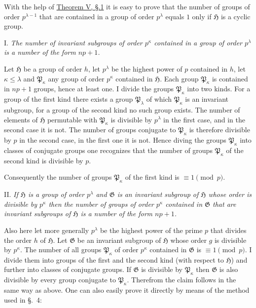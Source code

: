 \documentclass[a5paper,12pt]{article}
\let\fr\mathfrak
\newcommand{\CG}{\fr{G}}
\newcommand{\CH}{\fr{H}}
\newcommand{\CP}{\fr{P}}
\newcommand{\?}{{\color{blue}${}^{(?)}$}}
\newcounter{origpagecounter}{}
\newcommand{\origpagebreak}{\mark{\arabic{origpagecounter}}\addtocounter{origpagecounter}{1}\mark{\arabic{origpagecounter}}}
\begin{document}

With the help of 
\hyperref[t:1-5]{Theorem V, \S.1}
it is easy to prove
that the number of groups of order $p^{\lambda-1}$
that are contained in a group of order $p^\lambda$
equals $1$
only if
$\CH$ is a cyclic group.


I.
%
\label{t:5-1}
%
\emph{ %
The number of invariant subgroups of order $p^\kappa$
contained in a group of order $p^\lambda$
is a number of the form $n p + 1$.
}


Let $\CH$ be a group of order $h$,
let $p^\lambda$ be the highest power of $p$ contained in $h$,
let $\kappa \leq \lambda$
and
$\CP_\kappa$ any group of order $p^\kappa$
contained in $\CH$.
%
%
Each group $\CP_\kappa$ is contained in $n p + 1$ groups,
hence at least one.
%
%
I divide the groups $\CP_\kappa$
into two kinds.
%
%
For a group of the first kind
there exists 
a group $\CP_\lambda$
of which $\CP_\kappa$ is an invariant subgroup,
for a group of the second kind
no such group exists.
%
%
The number of elements of $\CH$
permutable with $\CP_\kappa$
is divisible by $p^\lambda$ in the first case,
and
in the second case it is not.
%
%
The number of groups
conjugate to $\CP_\kappa$ is therefore
divisible by $p$ in the second case,
in the first one it is not.
%
%
Hence diving the groups $\CP_\kappa$
into classes of conjugate groups
one recognizes
that the number of groups $\CP_\kappa$
of the second kind 
is divisible by $p$.
%
%
\origpagebreak
%
%
Consequently
the number of groups $\CP_\kappa$ of the first kind
is $\equiv 1 \pmod{p}$.


II.
%
\label{t:5-2}
%
\emph{ %
If $\CH$ is a group of order $p^\lambda$
and $\CG$ is an invariant subgroup of $\CH$
whose order is divisible by $p^\kappa$
then the number of groups of order $p^\kappa$
contained in $\CG$
that are invariant subgroups of $\CH$
is
a number of the form $n p + 1$.
}


Also here let more generally
$p^\lambda$ be the highest power of the prime $p$
that divides the order $h$ of $\CH$.
%
%
Let $\CG$ be an invariant subgroup of $\CH$
whose order $g$ is divisible by $p^\kappa$.
%
%
The number of all groups $\CP_\kappa$ of order $p^\kappa$
contained in $\CG$
is $\equiv 1 \pmod{p}$.
%
%
I divide them into groups of the first and the second kind
(with respect to $\CH$)
and
further
into classes of conjugate groups.
%
%
If $\CG$ is divisible by $\CP_\kappa$
then
$\CG$ is also divisible by every group
conjugate to $\CP_\kappa$.
%
%
Therefrom
the claim follows in the same way as above.
%
%
One can also easily prove it directly
by means of the method
used in \S.~4:
\end{document}
